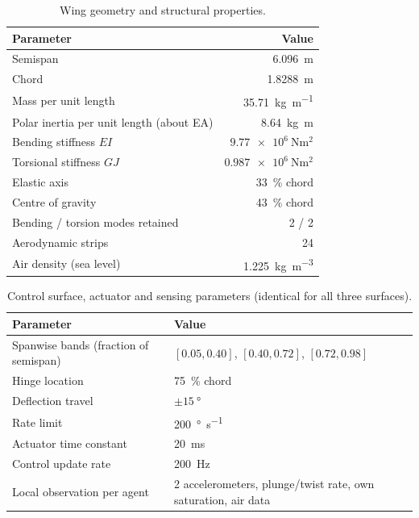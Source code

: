 \documentclass[preprint,11pt,authoryear]{elsarticle}
\begin{document}
\begin{table}[h]
\centering
\caption{Wing geometry and structural properties.}
\label{tab:params-wing}
\begin{tabular}{lr}
\toprule
Parameter & Value \\
\midrule
Semispan & \SI{6.096}{\metre} \\
Chord & \SI{1.8288}{\metre} \\
Mass per unit length & \SI{35.71}{\kilo\gram\per\metre} \\
Polar inertia per unit length (about EA) & \SI{8.64}{\kilo\gram\metre} \\
Bending stiffness $EI$ & $\SI{9.77e6}{\newton\metre\squared}$ \\
Torsional stiffness $GJ$ & $\SI{0.987e6}{\newton\metre\squared}$ \\
Elastic axis & \SI{33}{\percent} chord \\
Centre of gravity & \SI{43}{\percent} chord \\
Bending / torsion modes retained & 2 / 2 \\
Aerodynamic strips & 24 \\
Air density (sea level) & \SI{1.225}{\kilo\gram\per\cubic\metre} \\
\bottomrule
\end{tabular}
\end{table}

\begin{table}[h]
\centering
\caption{Control surface, actuator and sensing parameters (identical for all
three surfaces).}
\label{tab:params-actuator}
\begin{tabular}{@{}lp{6.0cm}@{}}
\toprule
Parameter & Value \\
\midrule
Spanwise bands (fraction of semispan) & $[0.05,0.40]$, $[0.40,0.72]$, $[0.72,0.98]$ \\
Hinge location & \SI{75}{\percent} chord \\
Deflection travel & $\pm\SI{15}{\degree}$ \\
Rate limit & \SI{200}{\degree\per\second} \\
Actuator time constant & \SI{20}{\milli\second} \\
Control update rate & \SI{200}{\hertz} \\
Local observation per agent & 2 accelerometers, plunge/twist rate, own
saturation, air data \\
\bottomrule
\end{tabular}
\end{table}
\end{document}
